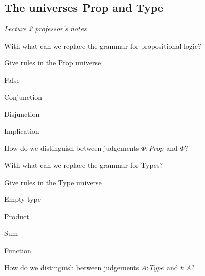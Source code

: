 \documentclass[fleqn]{article}
\begin{document}
\subsection{The universes Prop and Type}
\textit{Lecture 2 professor's notes}
\begin{enumerate}
    \item With what can we replace the grammar for propositional logic? 
    {\color{red}\item Give rules in the Prop universe}
    \begin{itemize}
        {\color{blue}\item False}
        {\color{red}\item Conjunction}
        {\color{blue}\item Disjunction}
        {\color{red}\item Implication}
    \end{itemize}
    {\color{red}\item How do we distinguish between judgements $\Phi : Prop$ and $\Phi$?}
    \item With what can we replace the grammar for Types? 
    {\color{red}\item Give rules in the Type universe }
    \begin{itemize}
        {\color{red}\item Empty type}
        {\color{red}\item Product}
        {\color{red}\item Sum}
        {\color{red}\item Function}
    \end{itemize}
    {\color{red}\item How do we distinguish between judgements $A : Type$ and $t : A$?}
\end{enumerate}
\end{document}
